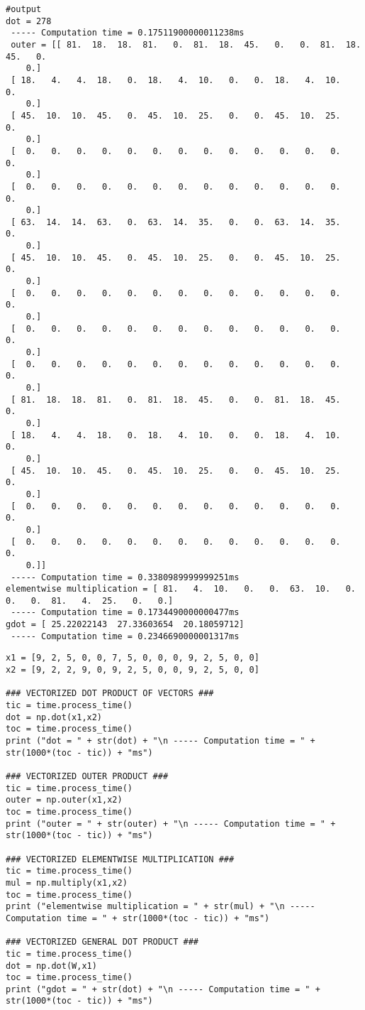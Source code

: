\begin{verbatim}
#output
dot = 278
 ----- Computation time = 0.17511900000011238ms
 outer = [[ 81.  18.  18.  81.   0.  81.  18.  45.   0.   0.  81.  18.  45.   0.
    0.]
 [ 18.   4.   4.  18.   0.  18.   4.  10.   0.   0.  18.   4.  10.   0.
    0.]
 [ 45.  10.  10.  45.   0.  45.  10.  25.   0.   0.  45.  10.  25.   0.
    0.]
 [  0.   0.   0.   0.   0.   0.   0.   0.   0.   0.   0.   0.   0.   0.
    0.]
 [  0.   0.   0.   0.   0.   0.   0.   0.   0.   0.   0.   0.   0.   0.
    0.]
 [ 63.  14.  14.  63.   0.  63.  14.  35.   0.   0.  63.  14.  35.   0.
    0.]
 [ 45.  10.  10.  45.   0.  45.  10.  25.   0.   0.  45.  10.  25.   0.
    0.]
 [  0.   0.   0.   0.   0.   0.   0.   0.   0.   0.   0.   0.   0.   0.
    0.]
 [  0.   0.   0.   0.   0.   0.   0.   0.   0.   0.   0.   0.   0.   0.
    0.]
 [  0.   0.   0.   0.   0.   0.   0.   0.   0.   0.   0.   0.   0.   0.
    0.]
 [ 81.  18.  18.  81.   0.  81.  18.  45.   0.   0.  81.  18.  45.   0.
    0.]
 [ 18.   4.   4.  18.   0.  18.   4.  10.   0.   0.  18.   4.  10.   0.
    0.]
 [ 45.  10.  10.  45.   0.  45.  10.  25.   0.   0.  45.  10.  25.   0.
    0.]
 [  0.   0.   0.   0.   0.   0.   0.   0.   0.   0.   0.   0.   0.   0.
    0.]
 [  0.   0.   0.   0.   0.   0.   0.   0.   0.   0.   0.   0.   0.   0.
    0.]]
 ----- Computation time = 0.3380989999999251ms
elementwise multiplication = [ 81.   4.  10.   0.   0.  63.  10.   0.   0.   0.  81.   4.  25.   0.   0.]
 ----- Computation time = 0.1734490000000477ms
gdot = [ 25.22022143  27.33603654  20.18059712]
 ----- Computation time = 0.2346690000001317ms
\end{verbatim}




\begin{verbatim}
x1 = [9, 2, 5, 0, 0, 7, 5, 0, 0, 0, 9, 2, 5, 0, 0]
x2 = [9, 2, 2, 9, 0, 9, 2, 5, 0, 0, 9, 2, 5, 0, 0]

### VECTORIZED DOT PRODUCT OF VECTORS ###
tic = time.process_time()
dot = np.dot(x1,x2)
toc = time.process_time()
print ("dot = " + str(dot) + "\n ----- Computation time = " + str(1000*(toc - tic)) + "ms")

### VECTORIZED OUTER PRODUCT ###
tic = time.process_time()
outer = np.outer(x1,x2)
toc = time.process_time()
print ("outer = " + str(outer) + "\n ----- Computation time = " + str(1000*(toc - tic)) + "ms")

### VECTORIZED ELEMENTWISE MULTIPLICATION ###
tic = time.process_time()
mul = np.multiply(x1,x2)
toc = time.process_time()
print ("elementwise multiplication = " + str(mul) + "\n ----- Computation time = " + str(1000*(toc - tic)) + "ms")

### VECTORIZED GENERAL DOT PRODUCT ###
tic = time.process_time()
dot = np.dot(W,x1)
toc = time.process_time()
print ("gdot = " + str(dot) + "\n ----- Computation time = " + str(1000*(toc - tic)) + "ms")
\end{verbatim}


